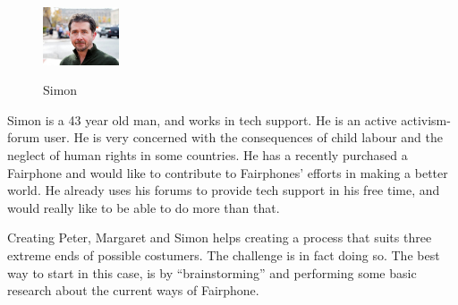 \documentclass[final,a4paper]{report} %
\begin{document}
\begin{figure}
	\centering
	\includegraphics[width=0.2\textwidth]{resources/Simon.jpg}
	\label{fig:Simon}
	\caption{Simon}
\end{figure}

Simon is a 43 year old man, and works in tech support. He is an active activism-forum user. He is very concerned with the consequences of child labour and the neglect of human rights in some countries. He has a recently purchased a Fairphone and would like to contribute to Fairphones' efforts in making a better world. He already uses his forums to provide tech support in his free time, and would really like to be able to do more than that.

Creating Peter, Margaret and Simon helps creating a process that suits three extreme ends of possible costumers. The challenge is in fact doing so. The best way to start in this case, is by ``brainstorming'' and performing some basic research about the current ways of Fairphone.
\end{document}
